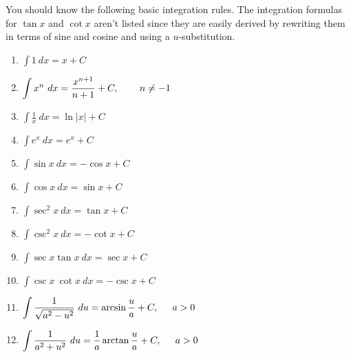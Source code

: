\documentclass{ximera}
\begin{document}
\begin{theorem}

You should know the following basic integration rules. The integration formulas for $\tan x$ and $\cot x$ aren’t
listed since they are easily derived by rewriting them in terms of sine and cosine and using a $u$-substitution.

\begin{enumerate}
\item $\displaystyle \int 1 \ dx = x+C $


\item $\displaystyle \int x^n \ dx = \frac{x^{n+1}}{n+1} + C, \hspace{0.3in} n \ne -1 $


\item $\displaystyle \int \frac{1}{x} \ dx = \ln |x| + C $


\item $\displaystyle \int e^x \ dx = e^x + C $


\item $\displaystyle \int \sin x \ dx = - \cos x + C $


\item $\displaystyle \int \cos x \ dx = \sin x + C$


\item $\displaystyle  \int \sec^2 x \ dx = \tan x + C $


\item $\displaystyle \int \csc^2 x \ dx = -\cot x + C $


\item $\displaystyle \int \sec x \tan x \ dx = \sec x + C $


\item $\displaystyle \int \csc x \ \cot x \ dx = -\csc x + C $


\item $\displaystyle \int \frac{1}{\sqrt{a^2-u^2}} \ du =  \arcsin \frac{u}{a} + C, \hspace{0.2in} a > 0 $


\item $\displaystyle \int \frac{1}{a^2 + u^2} \ du =  \frac{1}{a} \arctan \frac{u}{a} + C, \hspace{0.2in} a > 0$

\end{enumerate}
\end{theorem}
\end{document}

